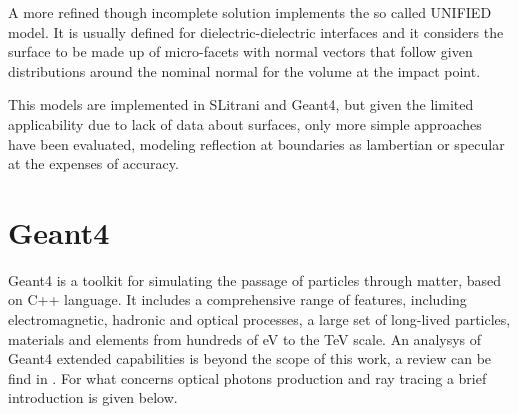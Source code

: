 A more refined though incomplete solution implements the so called UNIFIED model.  
It is usually defined for dielectric-dielectric interfaces and it considers the surface to be made up of micro-facets with normal vectors that follow given distributions around the nominal normal for the volume at the impact point.

This models are implemented in SLitrani and Geant4, but given the limited applicability due to lack of data about surfaces, only more simple approaches have been evaluated, modeling reflection at boundaries as lambertian or specular at the expenses of accuracy.

\section{Geant4}
Geant4 is a toolkit for simulating the passage of particles through matter, based on C++ language. It includes a comprehensive range of features, including electromagnetic, hadronic and optical processes, a large set of long-lived particles, materials and elements from hundreds of eV to the TeV scale.
An analysys of Geant4 extended capabilities is beyond the scope of this work, a review can be find in \cite{Agostinelli2003}.
For what concerns optical photons production and ray tracing a brief introduction is given below.

